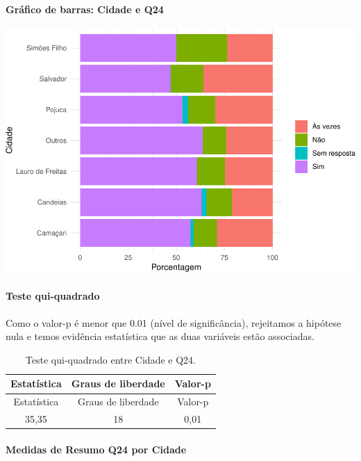 \documentclass[]{article}
\let\oldparagraph\paragraph
\renewcommand{\paragraph}[1]{\oldparagraph{#1}\mbox{}}
\begin{document}
\hypertarget{gruxe1fico-de-barras-cidade-e-q24}{%
\paragraph{Gráfico de barras: Cidade e Q24}\label{gruxe1fico-de-barras-cidade-e-q24}}

\begin{center}\includegraphics[width=0.75\linewidth]{relatorio_covid19_files/figure-latex/unnamed-chunk-603-1} \end{center}

\hypertarget{teste-qui-quadrado-52}{%
\paragraph{Teste qui-quadrado}\label{teste-qui-quadrado-52}}

Como o valor-p é menor que 0.01 (nível de significância), rejeitamos a hipótese nula e temos evidência estatística que as duas variáveis estão associadas.

\begin{longtable}[]{@{}ccc@{}}
\caption{\label{tab:unnamed-chunk-605}Teste qui-quadrado entre Cidade e Q24.}\tabularnewline
\toprule
Estatística & Graus de liberdade & Valor-p\tabularnewline
\midrule
\endfirsthead
\toprule
Estatística & Graus de liberdade & Valor-p\tabularnewline
\midrule
\endhead
35,35 & 18 & 0,01\tabularnewline
\bottomrule
\end{longtable}

\cleardoublepage

\hypertarget{medidas-de-resumo-q24-por-cidade}{%
\paragraph{Medidas de Resumo Q24 por Cidade}\label{medidas-de-resumo-q24-por-cidade}}
\end{document}
